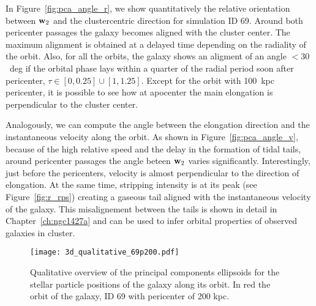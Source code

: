 In Figure~\ref{fig:pca_angle_r}, we show quantitatively the relative orientation between $\boldsymbol{\mathbf{w}}_2$ and the clustercentric direction for simulation ID 69.
Around both pericenter passages the galaxy becomes aligned with the cluster center.
The maximum alignment is obtained at a delayed time depending on the radiality of the orbit.
Also, for all the orbits, the galaxy shows an aligment of an angle $<30$~deg if the orbital phase lays within a quarter of the radial period soon after pericenter, \ie{} $\tau \in [0, 0.25] \cup{} [1, 1.25]$.
Except for the orbit with 100~kpc pericenter, it is possible to see how at apocenter the main elongation is perpendicular to the cluster center. %

Analogously, we can compute the angle between the elongation direction and the instantaneous velocity along the orbit.
As shown in Figure~\ref{fig:pca_angle_v}, because of the high relative speed and the delay in the formation of tidal tails, around pericenter passages the angle beteen $\boldsymbol{\mathbf{w}}_2$ varies significantly.
Interestingly, just before the pericenters, velocity is almost perpendicular to the direction of elongation.
At the same time, stripping intensity is at its peak (see Figure~\ref{fig:r_rps}) creating a gaseous tail aligned with the instantaneous velocity of the galaxy.
This misalignement between the tails is shown in detail in Chapter~\ref{ch:ngc1427a} and can be used to infer orbital properties of observed galaxies in cluster.

\begin{figure}
\centering
\texttt{[image: 3d\_qualitative\_69p200.pdf]}
\caption{Qualitative overview of the principal components ellipsoids for the stellar particle positions of the galaxy along its orbit.
In red the orbit of the galaxy, ID 69 with pericenter of 200 kpc.}
\label{fig:pca}
\end{figure}

